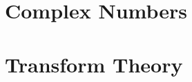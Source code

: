 \documentclass[8pt]{report}
\begin{document}
\chapter{Complex Numbers}
\chapter{Transform Theory}
\end{document}
